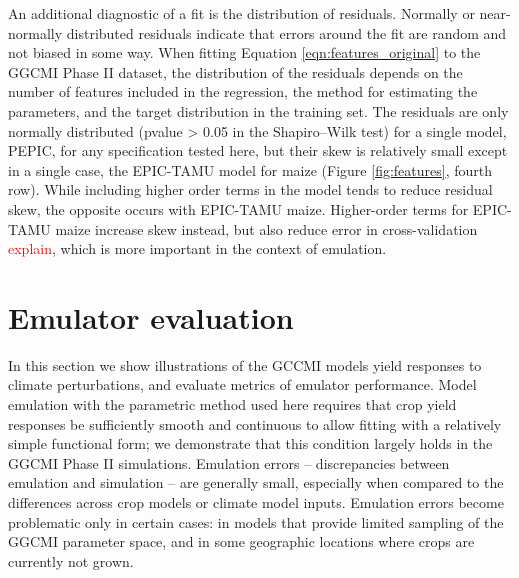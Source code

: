 \documentclass[gmd, manuscript]{copernicus} %
\begin{document}
An additional diagnostic of a fit is the distribution of residuals. Normally or near-normally distributed residuals indicate that errors around the fit are random and not biased in some way. 
When fitting Equation \ref{eqn:features_original} to the GGCMI Phase II dataset, the distribution of the residuals depends on the number of features included in the regression, the method for estimating the parameters, and the target distribution in the training set. The residuals are only normally distributed (pvalue > 0.05 in the Shapiro–Wilk test) for a single model, PEPIC, for any specification tested here, but %
their skew is relatively small except in a single case, the EPIC-TAMU model for maize (Figure \ref{fig:features}, fourth row).
While including higher order terms in the model tends to reduce residual skew, the opposite occurs with EPIC-TAMU maize. 
 Higher-order terms for EPIC-TAMU maize increase skew instead, but also reduce error in cross-validation \textcolor{red}{explain}, which is more important in the context of emulation.


\section{Emulator evaluation}
\label{S:4}
In this section we show illustrations of the GCCMI models yield responses to climate perturbations, and evaluate metrics of emulator performance. 
Model emulation with the parametric method used here requires that crop yield responses be sufficiently smooth and continuous to allow fitting with a relatively simple functional form; we demonstrate that this condition largely holds in the GGCMI Phase II simulations. Emulation errors -- discrepancies between emulation and simulation --  are generally small, especially when compared to the differences across crop models or climate model inputs.
Emulation errors become problematic only in certain cases: in models that provide limited sampling of the GGCMI parameter space, and in some geographic locations where crops are currently not grown. 
\end{document}
